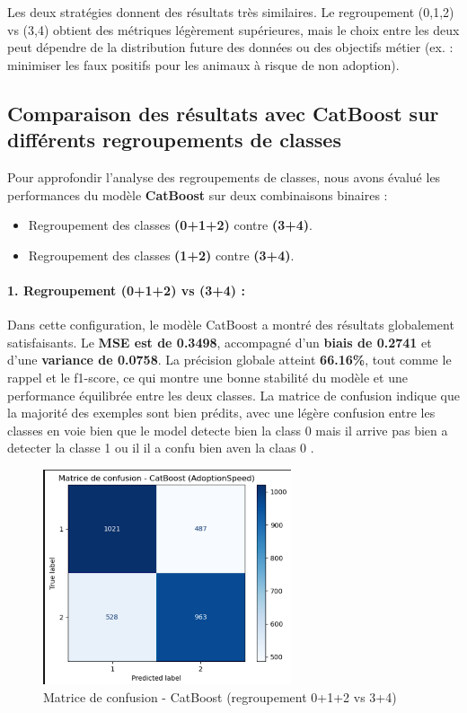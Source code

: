 \documentclass[a4paper,12pt]{article}
\begin{document}
Les deux stratégies donnent des résultats très similaires. Le regroupement (0,1,2) vs (3,4) obtient des métriques légèrement supérieures, mais le choix entre les deux peut dépendre de la distribution future des données ou des objectifs métier (ex. : minimiser les faux positifs pour les animaux à risque de non adoption).



\subsection{Comparaison des résultats avec CatBoost sur différents regroupements de classes}

Pour approfondir l’analyse des regroupements de classes, nous avons évalué les performances du modèle \textbf{CatBoost} sur deux combinaisons binaires : 
\begin{itemize}
    \item Regroupement des classes \textbf{(0+1+2)} contre \textbf{(3+4)}.
    \item Regroupement des classes \textbf{(1+2)} contre \textbf{(3+4)}.
\end{itemize}

\paragraph{1. Regroupement (0+1+2) vs (3+4) :}

Dans cette configuration, le modèle CatBoost a montré des résultats globalement satisfaisants.
 Le \textbf{MSE est de 0.3498}, accompagné d’un \textbf{biais de 0.2741} et d’une \textbf{variance de 0.0758}.
  La précision globale atteint \textbf{66.16\%}, tout comme le rappel et le f1-score, ce qui montre une bonne
   stabilité du modèle et une performance équilibrée entre les deux classes. La matrice de 
   confusion indique que la majorité des exemples sont bien prédits, avec une légère confusion entre les classes en voie 
   bien que le model detecte bien la class 0 mais il arrive pas bien a detecter la classe 1 ou il il a confu bien aven la claas 0 .

\begin{figure}[H]
    \centering
    \includegraphics[width=0.65\textwidth]{catboost_012_vs_34_confusion.png}
    \caption{Matrice de confusion - CatBoost (regroupement 0+1+2 vs 3+4)}
    \label{fig:catboost012_conf}
\end{figure}
\end{document}
